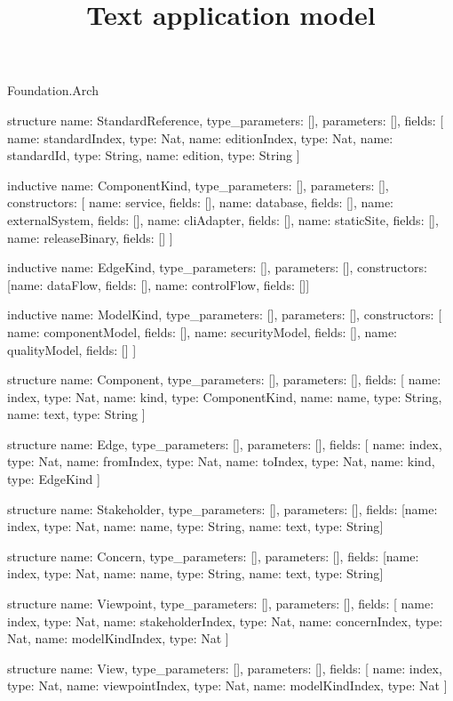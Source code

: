 \begin{lexlean}{Foundation.Arch}
\title{Text application model}
\begin{semanticmodule}
structure{
  name: StandardReference,
  type_parameters: [],
  parameters: [],
  fields: [
    {name: standardIndex, type: Nat},
    {name: editionIndex, type: Nat},
    {name: standardId, type: String},
    {name: edition, type: String}
  ]
}

inductive{
  name: ComponentKind,
  type_parameters: [],
  parameters: [],
  constructors: [
    {name: service, fields: []},
    {name: database, fields: []},
    {name: externalSystem, fields: []},
    {name: cliAdapter, fields: []},
    {name: staticSite, fields: []},
    {name: releaseBinary, fields: []}
  ]
}

inductive{
  name: EdgeKind,
  type_parameters: [],
  parameters: [],
  constructors: [{name: dataFlow, fields: []}, {name: controlFlow, fields: []}]
}

inductive{
  name: ModelKind,
  type_parameters: [],
  parameters: [],
  constructors: [
    {name: componentModel, fields: []},
    {name: securityModel, fields: []},
    {name: qualityModel, fields: []}
  ]
}

structure{
  name: Component,
  type_parameters: [],
  parameters: [],
  fields: [
    {name: index, type: Nat},
    {name: kind, type: ComponentKind},
    {name: name, type: String},
    {name: text, type: String}
  ]
}

structure{
  name: Edge,
  type_parameters: [],
  parameters: [],
  fields: [
    {name: index, type: Nat},
    {name: fromIndex, type: Nat},
    {name: toIndex, type: Nat},
    {name: kind, type: EdgeKind}
  ]
}

structure{
  name: Stakeholder,
  type_parameters: [],
  parameters: [],
  fields: [{name: index, type: Nat}, {name: name, type: String}, {name: text, type: String}]
}

structure{
  name: Concern,
  type_parameters: [],
  parameters: [],
  fields: [{name: index, type: Nat}, {name: name, type: String}, {name: text, type: String}]
}

structure{
  name: Viewpoint,
  type_parameters: [],
  parameters: [],
  fields: [
    {name: index, type: Nat},
    {name: stakeholderIndex, type: Nat},
    {name: concernIndex, type: Nat},
    {name: modelKindIndex, type: Nat}
  ]
}

structure{
  name: View,
  type_parameters: [],
  parameters: [],
  fields: [
    {name: index, type: Nat},
    {name: viewpointIndex, type: Nat},
    {name: modelKindIndex, type: Nat}
  ]
}


\end{semanticmodule}
\end{lexlean}
